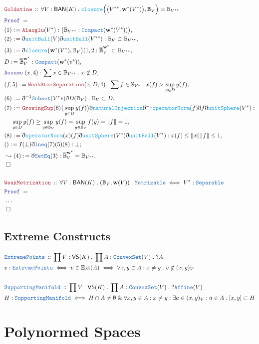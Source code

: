\documentclass[12pt]{scrartcl}
\newcommand{\TYPE}[1]{\textcolor{NavyBlue}{\mathtt{#1}}}
\newcommand{\FUNC}[1]{\textcolor{Cerulean}{\mathtt{#1}}}
\newcommand{\LOGIC}[1]{\textcolor{Blue}{\mathtt{#1}}}
\newcommand{\THM}[1]{\textcolor{Maroon}{\mathtt{#1}}}
\renewcommand{\.}{\; . \;}
\newcommand{\de}{: \kern 0.1pc =}
\newcommand{\Theorem}[2]{& \THM{#1} \, :: \, #2 \\ & \Proof = \\ }
\newcommand{\DeclareType}[2]{& \TYPE{#1} \, :: \, #2 \\}
\newcommand{\DefineType}[3]{& #1 : \TYPE{#2} \iff #3 \\}
\newcommand{\DefineNamedType}[4]{& #1 : \TYPE{#2} \iff #3 \iff #4 \\}
\newcommand{\NewLine}{\\ & \kern 1pc}
\newcommand{\Page}[1]{\begin{align*} #1 \end{align*} \newpage   }
\newcommand{ \bd }{ \ByDef }
\newcommand{\NoProof}{ & \ldots \\ \EndProof}
\renewcommand{\And}{\; \& \;}
\newcommand{\Say}[3]{& #1 \de #2 : #3, \\}
\newcommand{\Conclude}[3]{& #1 \de #2 : #3; \\}
\newcommand{\Derive}[3]{& \leadsto #1 \de #2 : #3, \\}
\newcommand{\A}{\LOGIC{Assume} \;}
\newcommand{\Assume}[2]{& \A #1 : #2, \\}
\newcommand{\QED}{\; \square}
\newcommand{\EndProof}{& \QED \\}
\newcommand{\ByDef}{\eth}
\newcommand{\Proof}{\LOGIC{Proof} \; }
\newcommand{\BAN}{\textsf{BAN}}
\begin{document}
\Page{
\Theorem{Goldstine}{\forall V : \BAN(K) \. \FUNC{closure}\Big(\big(V^{**},\mathbf{w}^*(V^*)\big),\mathbb{B}_V\Big) = \mathbb{B}_{V^{**}} }
\Say{(1)}{ \THM{Alaoglu}(V^*)  }{\big(\mathbb{B}_{V^{**}} : \TYPE{Compact}(\mathbf{w}^*(V^*)) \big) }
\Say{(2)}{\bd \FUNC{unitBall}(V) \bd \FUNC{unitBall}(V^{**})}{ \mathbb{B}_V \subset \mathbb{B}_{V^{**}}}
\Say{(3)}{ \bd \FUNC{closure}\big( \mathbf{w}^*(V^* ), \mathbb{B}_V \big)(1,2  }{ \overline{\mathbb{B}}^{\mathbf{w}^*}_V \subset \mathbb{B}_{V^{**}} }
\Say{D}{\overline{\mathbb{B}}^{\mathbf{w}^*}_V}{\TYPE{Compact}(\mathbf{w}^*(v^*))}
\Assume{(x,4)}{ \sum x \in \mathbb{B}_{V^{**}} \. x \not \in D }
\Say{(f,5)}{\THM{WeakStarSeparation}(x,D,4)}{ \sum f \in \mathbb{S}_{V^*} \. x(f) > \sup_{y \in D} y(f) }
\Say{(6)}{ \bd^{-1} \TYPE{Subset}(V^**)\bd D( \mathbb{B}_V) }{  \mathbb{B}_V \subset D }
\Say{(7)}{ \THM{GrowingSup}(6) \big( \sup_{y \in D} y(f) \big) \bd \FUNC{naturalInjection} \bd^{-1} \FUNC{operatorNorm}(f) \bd f \bd \FUNC{unitSphere}(V^*) }
{ \NewLine \sup_{y \in D} y(f) \ge \sup_{y \in \mathbb{B}_V} y(f) =\sup_{y \in \mathbb{B}_V} f(y) = \| f \| = 1 }
\Say{(8)}{ \bd \FUNC{operatorNorm}(x)(f) \bd \FUNC{unitSphere}(V^*) \bd \FUNC{unitBall}(V^*) }{ x(f) \le \| x \| \| f \| \le 1 }
\Conclude{()}{I(\bot)\bd\TYPE{Ineq}(7)(5)(8)}{\bot}
\Derive{(4)}{ \bd \TYPE{SetEq}(3)}{ \overline{\mathbb{B}}_V^{\mathbf{w}^*} = \mathbb{B}_{V^{**} } }
\EndProof
\\
\Theorem{WeakMetrization}{ \forall V : \BAN(K) \. (\mathbb{B}_V,\mathbf{w}(V)) : \TYPE{Metrizable} \iff V^* : \TYPE{Separable}}
\NoProof
}
\subsection{Extreme Constructs}
\Page{
\DeclareType{ExtremePoints}{\prod V : \mathsf{VS}(K) \. \prod A : \TYPE{ConvexSet}(V) \. ? A}
\DefineNamedType{v}{ExtremePoints}{ v \in \mathrm{Ext}(A)}{ \forall x,y \in A : x \neq y \. v \not \in (x,y)_V}
\\
\DeclareType{SupportingManifold}{\prod V : \mathsf{VS}(K) \. \prod A : \TYPE{ConvexSet}(V) \. ?\TYPE{Affine}(V) }
\DefineType{H}{SupportingManifold}{H \cap A \neq \emptyset \And \forall x,y \in A : x \neq y : \exists a \in (x,y)_V : a \in A  \. [x,y] \subset H   }
}
\section{Polynormed Spaces}
\end{document}
